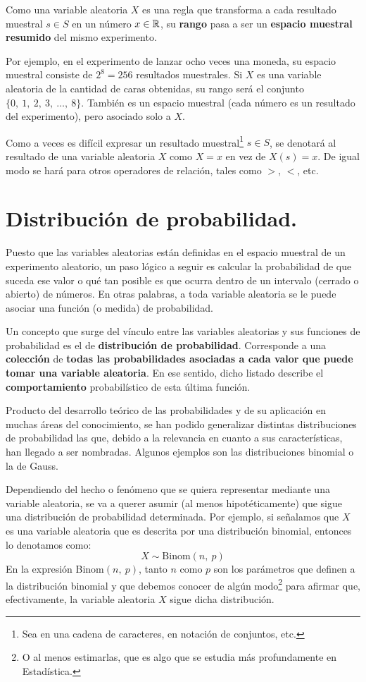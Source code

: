 \documentclass[12pt]{article}
\begin{document}
Como una variable aleatoria $X$ es una regla que transforma a cada resultado muestral $s \in S$ en un número $x \in \mathbb{R}$, su \textbf{rango} pasa a ser un \textbf{espacio muestral resumido} del mismo experimento.

Por ejemplo, en el experimento de lanzar ocho veces una moneda, su espacio muestral consiste de $2^{8} = 256$ resultados muestrales. Si $X$ es una variable aleatoria de la cantidad de caras obtenidas, su rango será el conjunto $\{0, \ 1, \ 2, \ 3, \ \ldots, \ 8\}$. También es un espacio muestral (cada número es un resultado del experimento), pero asociado solo a $X$.

Como a veces es difícil expresar un resultado muestral\footnote{Sea en una cadena de caracteres, en notación de conjuntos, etc.} $s \in S$, se denotará al resultado de una variable aleatoria $X$ como $X = x$ en vez de $X(s) = x$. De igual modo se hará para otros operadores de relación, tales como $>$, $<$, etc.


\section{Distribución de probabilidad.}

Puesto que las variables aleatorias están definidas en el espacio muestral de un experimento aleatorio, un paso lógico a seguir es calcular la probabilidad de que suceda ese valor o qué tan posible es que ocurra dentro de un intervalo (cerrado o abierto) de números. En otras palabras, a toda variable aleatoria se le puede asociar una función (o medida) de probabilidad.

Un concepto que surge del vínculo entre las variables aleatorias y sus funciones de probabilidad es el de \textbf{distribución de probabilidad}. Corresponde a una \textbf{colección} de \textbf{todas las probabilidades asociadas a cada valor que puede tomar una variable aleatoria}. En ese sentido, dicho listado describe el \textbf{comportamiento} probabilístico de esta última función.

Producto del desarrollo teórico de las probabilidades y de su aplicación en muchas áreas del conocimiento, se han podido generalizar distintas distribuciones de probabilidad las que, debido a la relevancia en cuanto a sus características, han llegado a ser nombradas. Algunos ejemplos son las distribuciones binomial o la de Gauss.

Dependiendo del hecho o fenómeno que se quiera representar mediante una variable aleatoria, se va a querer asumir (al menos hipotéticamente) que sigue una distribución de probabilidad determinada. Por ejemplo, si señalamos que $X$ es una variable aleatoria que es descrita por una distribución binomial, entonces lo denotamos como:
\[
  X \sim \text{Binom}(n, \ p)
\]
En la expresión Binom$(n, \ p)$, tanto $n$ como $p$ son los parámetros que definen a la distribución binomial y que debemos conocer de algún modo\footnote{O al menos estimarlas, que es algo que se estudia más profundamente en Estadística.} para afirmar que, efectivamente, la variable aleatoria $X$ sigue dicha distribución.
\end{document}
